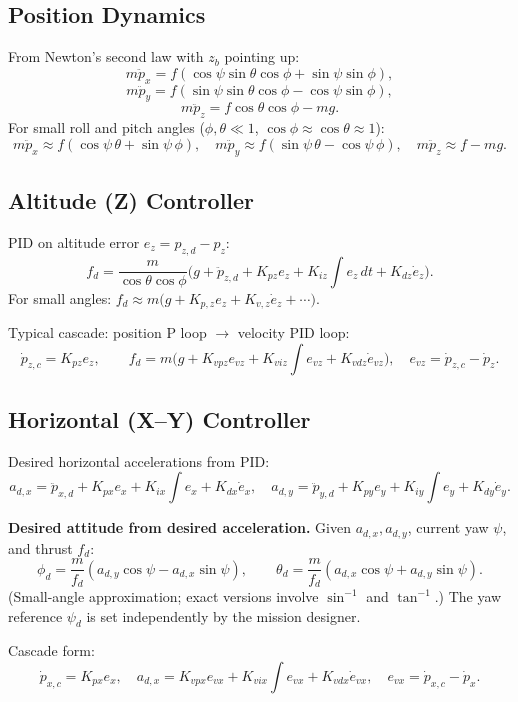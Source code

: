 \documentclass[11pt,a4paper]{article}
\begin{document}
\subsection{Position Dynamics}

From Newton's second law with $z_b$ pointing up:
\[
m\ddot{p}_x = f(\cos\psi\sin\theta\cos\phi + \sin\psi\sin\phi),
\]
\[
m\ddot{p}_y = f(\sin\psi\sin\theta\cos\phi - \cos\psi\sin\phi),
\]
\[
m\ddot{p}_z = f\cos\theta\cos\phi - mg.
\]
For small roll and pitch angles ($\phi,\theta\ll 1$, $\cos\phi\approx\cos\theta\approx 1$):
\[
m\ddot{p}_x \approx f(\cos\psi\,\theta + \sin\psi\,\phi),
\quad
m\ddot{p}_y \approx f(\sin\psi\,\theta - \cos\psi\,\phi),
\quad
m\ddot{p}_z \approx f - mg.
\]

\subsection{Altitude (Z) Controller}

PID on altitude error $e_z = p_{z,d} - p_z$:
\[
f_d = \frac{m}{\cos\theta\cos\phi}\bigl(g + \ddot{p}_{z,d} + K_{pz}e_z + K_{iz}\int e_z\,dt + K_{dz}\dot{e}_z\bigr).
\]
For small angles: $f_d \approx m\bigl(g + K_{p,z}e_z + K_{v,z}\dot{e}_z + \cdots\bigr)$.

Typical cascade: position P loop $\to$ velocity PID loop:
\[
\dot{p}_{z,c} = K_{pz}e_z,\qquad
f_d = m\bigl(g + K_{vpz}e_{vz} + K_{viz}\int e_{vz} + K_{vdz}\dot{e}_{vz}\bigr),\quad e_{vz}=\dot{p}_{z,c}-\dot{p}_z.
\]

\subsection{Horizontal (X--Y) Controller}

Desired horizontal accelerations from PID:
\[
a_{d,x} = \ddot{p}_{x,d} + K_{px}e_x + K_{ix}\int e_x + K_{dx}\dot{e}_x,
\quad
a_{d,y} = \ddot{p}_{y,d} + K_{py}e_y + K_{iy}\int e_y + K_{dy}\dot{e}_y.
\]

\textbf{Desired attitude from desired acceleration.}
Given $a_{d,x}, a_{d,y}$, current yaw $\psi$, and thrust $f_d$:
\[
\phi_d = \frac{m}{f_d}(a_{d,y}\cos\psi - a_{d,x}\sin\psi), \qquad \theta_d = \frac{m}{f_d}(a_{d,x}\cos\psi + a_{d,y}\sin\psi).
\]
(Small-angle approximation; exact versions involve $\sin^{-1}$ and $\tan^{-1}$.)
The yaw reference $\psi_d$ is set independently by the mission designer.

Cascade form:
\[
\dot{p}_{x,c} = K_{px}e_x,\quad
a_{d,x} = K_{vpx}e_{vx} + K_{vix}\int e_{vx} + K_{vdx}\dot{e}_{vx},\quad e_{vx}=\dot{p}_{x,c}-\dot{p}_x.
\]
\end{document}
